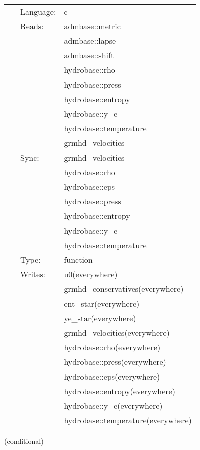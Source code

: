 \documentclass{article}
\begin{document}
\hspace{5mm}{\it entropy+tabulated version of grhaylhd\_outer\_boundaries } 


\hspace{5mm}

 \begin{tabular*}{160mm}{cll} 
~ & Language:  & c \\ 
~ & Reads:  & admbase::metric \\ 
~& ~ &admbase::lapse\\ 
~& ~ &admbase::shift\\ 
~& ~ &hydrobase::rho\\ 
~& ~ &hydrobase::press\\ 
~& ~ &hydrobase::entropy\\ 
~& ~ &hydrobase::y\_e\\ 
~& ~ &hydrobase::temperature\\ 
~& ~ &grmhd\_velocities\\ 
~ & Sync:  & grmhd\_velocities \\ 
~& ~ &hydrobase::rho\\ 
~& ~ &hydrobase::eps\\ 
~& ~ &hydrobase::press\\ 
~& ~ &hydrobase::entropy\\ 
~& ~ &hydrobase::y\_e\\ 
~& ~ &hydrobase::temperature\\ 
~ & Type:  & function \\ 
~ & Writes:  & u0(everywhere) \\ 
~& ~ &grmhd\_conservatives(everywhere)\\ 
~& ~ &ent\_star(everywhere)\\ 
~& ~ &ye\_star(everywhere)\\ 
~& ~ &grmhd\_velocities(everywhere)\\ 
~& ~ &hydrobase::rho(everywhere)\\ 
~& ~ &hydrobase::press(everywhere)\\ 
~& ~ &hydrobase::eps(everywhere)\\ 
~& ~ &hydrobase::entropy(everywhere)\\ 
~& ~ &hydrobase::y\_e(everywhere)\\ 
~& ~ &hydrobase::temperature(everywhere)\\ 
\end{tabular*} 


\vspace{5mm}

   (conditional) 
\end{document}
